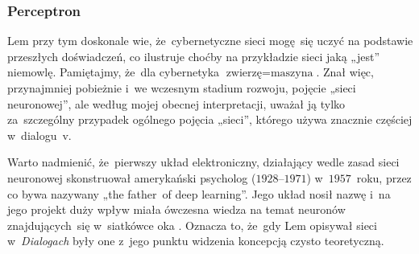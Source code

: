 \documentclass[10pt,t]{beamer}
\begin{document}
\begin{frame}

\end{frame}





\begin{frame}
  \frametitle{Perceptron}


  Lem przy tym doskonale wie, że~cybernetyczne sieci mogę~się uczyć na
  podstawie przeszłych doświadczeń, co ilustruje choćby na przykładzie
  sieci jaką „jest” niemowlę. Pamiętajmy, że~dla cybernetyka
  $\text{zwierzę} = \text{maszyna}$. Znał więc, przynajmniej pobieżnie
  i~we wczesnym stadium rozwoju, pojęcie „sieci neuronowej”, ale według
  mojej obecnej interpretacji, uważał ją tylko za~szczególny przypadek
  ogólnego pojęcia „sieci”, którego używa znacznie częściej w~dialogu~v.

  Warto nadmienić, że~pierwszy układ elektroniczny, działający
  wedle zasad sieci neuronowej skonstruował amerykański psycholog
   ($1928\text{--}1971$) w~$1957$~roku, przez co bywa nazywany
  „the father~of deep learning”. Jego układ nosił nazwę
  i~na jego projekt duży wpływ miała ówczesna wiedza na temat neuronów
  znajdujących~się w~siatkówce oka
  \parencite{Bielecki-Sztuczne-sieci-neuronowe-Slowniki-ETC-Vol-XIII-Ver-2025}. Oznacza to, że~gdy Lem opisywał sieci w~\textit{Dialogach} były
  one z~jego punktu widzenia koncepcją czysto teoretyczną.

\end{frame}
\end{document}
